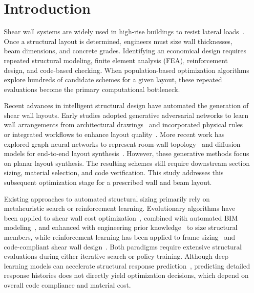 \section{Introduction}
\label{sec:intro}

Shear wall systems are widely used in high-rise buildings to resist lateral loads~\cite{Paulay1992SeismicDesign}. Once a structural layout is determined, engineers must size wall thicknesses, beam dimensions, and concrete grades. Identifying an economical design requires repeated structural modeling, finite element analysis (FEA), reinforcement design, and code-based checking. When population-based optimization algorithms explore hundreds of candidate schemes for a given layout, these repeated evaluations become the primary computational bottleneck.

Recent advances in intelligent structural design have automated the generation of shear wall layouts. Early studies adopted generative adversarial networks to learn wall arrangements from architectural drawings~\cite{Liao2021} and incorporated physical rules or integrated workflows to enhance layout quality~\cite{Lu2022,Fei2022}. More recent work has explored graph neural networks to represent room-wall topology~\cite{Zhao2023} and diffusion models for end-to-end layout synthesis~\cite{Leng2024,ArchiDiffusion}. However, these generative methods focus on planar layout synthesis. The resulting schemes still require downstream section sizing, material selection, and code verification. This study addresses this subsequent optimization stage for a prescribed wall and beam layout.

Existing approaches to automated structural sizing primarily rely on metaheuristic search or reinforcement learning. Evolutionary algorithms have been applied to shear wall cost optimization~\cite{Atabay2009}, combined with automated BIM modeling~\cite{Tafraout2019}, and enhanced with engineering prior knowledge~\cite{Zhou2022} to size structural members, while reinforcement learning has been applied to frame sizing~\cite{Jeong2021,Du2025FrameGym} and code-compliant shear wall design~\cite{Zhao2026}. Both paradigms require extensive structural evaluations during either iterative search or policy training. Although deep learning models can accelerate structural response prediction~\cite{djerrad2024efficient,zhou2024physics}, predicting detailed response histories does not directly yield optimization decisions, which depend on overall code compliance and material cost.

